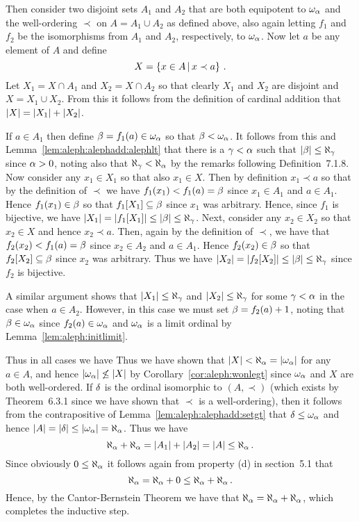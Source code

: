 {{    Then consider two disjoint sets $A_1$ and $A_2$ that are both equipotent to $\omega_\alpha$ and the well-ordering $\prec$ on $A = A_1 \cup A_2$ as defined above, also again letting $f_1$ and $f_2$ be the isomorphisms from $A_1$ and $A_2$, respectively, to $\omega_\alpha$.
    Now let $a$ be any element of $A$ and define
    $$
    X = \left\{ x \in A \,|\, x \prec a \right\} \,.
    $$
    Let $X_1 = X \cap A_1$ and $X_2 = X \cap A_2$ so that clearly $X_1$ and $X_2$ are disjoint and $X = X_1 \cup X_2$.
    From this it follows from the definition of cardinal addition that $\left| X \right| = \left| X_1 \right| + \left| X_2 \right|$.

    If $a \in A_1$ then define $\beta = f_1(a) \in \omega_\alpha$ so that $\beta < \omega_\alpha$.
    It follows from this and Lemma~\ref{lem:aleph:alephadd:alephlt} that there is a $\gamma < \alpha$ such that $\left| \beta \right| \leq \aleph_\gamma$ since $\alpha > 0$, noting also that $\aleph_\gamma < \aleph_\alpha$ by the remarks following Definition~7.1.8.
    Now consider any $x_1 \in X_1$ so that also $x_1 \in X$.
    Then by definition $x_1 \prec a$ so that by the definition of $\prec$ we have $f_1(x_1) < f_1(a) = \beta$ since $x_1 \in A_1$ and $a \in A_1$.
    Hence $f_1(x_1) \in \beta$ so that $f_1[X_1] \subseteq \beta$ since $x_1$ was arbitrary.
    Hence, since $f_1$ is bijective, we have $\left| X_1 \right| = \left| f_1[X_1] \right| \leq \left| \beta \right| \leq \aleph_\gamma$.
    Next, consider any $x_2 \in X_2$ so that $x_2 \in X$ and hence $x_2 \prec a$.
    Then, again by the definition of $\prec$, we have that $f_2(x_2) < f_1(a) = \beta$ since $x_2 \in A_2$ and $a \in A_1$.
    Hence $f_2(x_2) \in \beta$ so that $f_2[X_2] \subseteq \beta$ since $x_2$ was arbitrary.
    Thus we have $\left| X_2 \right| = \left| f_2[X_2] \right| \leq \left| \beta \right| \leq \aleph_\gamma$ since $f_2$ is bijective.

    A similar argument shows that $\left| X_1 \right| \leq \aleph_\gamma$ and $\left| X_2 \right| \leq \aleph_\gamma$ for some $\gamma < \alpha$ in the case when $a \in A_2$.
    However, in this case we must set $\beta = f_2(a) + 1$, noting that $\beta \in \omega_\alpha$ since $f_2(a) \in \omega_\alpha$ and $\omega_\alpha$ is a limit ordinal by Lemma~\ref{lem:aleph:initlimit}.

    Thus in all cases we have
    Thus we have shown that $\left| X \right| < \aleph_\alpha = \left| \omega_\alpha \right|$ for any $a \in A$, and hence $\left| \omega_\alpha \right| \not\leq \left| X \right|$ by Corollary~\ref{cor:aleph:wonlegt} since $\omega_\alpha$ and $X$ are both well-ordered.
    If $\delta$ is the ordinal isomorphic to $(A, \prec)$ (which exists by Theorem~6.3.1 since we have shown that $\prec$ is a well-ordering), then it follows from the contrapositive of Lemma~\ref{lem:aleph:alephadd:setgt} that $\delta \leq \omega_\alpha$ and hence $\left| A \right| = \left| \delta \right| \leq \left| \omega_\alpha \right| = \aleph_\alpha$.
    Thus we have
    $$
    \aleph_\alpha + \aleph_\alpha = \left| A_1 \right| + \left| A_2 \right| = \left| A \right| \leq \aleph_\alpha \,.
    $$
    Since obviously $0 \leq \aleph_\alpha$ it follows again from property (d) in section~5.1 that
    $$
    \aleph_\alpha = \aleph_\alpha + 0 \leq \aleph_\alpha + \aleph_\alpha \,.
    $$
    Hence, by the Cantor-Bernstein Theorem we have that $\aleph_\alpha = \aleph_\alpha + \aleph_\alpha$, which completes the inductive step.
  }
}


